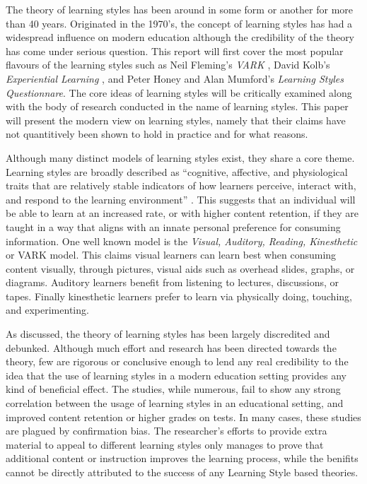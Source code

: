 \documentclass[12pt]{report}
\begin{document}
The theory of learning styles has been around in some form or another for more
than 40 years. Originated in the 1970's, the concept of learning styles has had
a widespread influence on modern education although the credibility of the
theory has come under serious question. This report will first cover the most
popular flavours of the learning styles such as Neil Fleming's \textit{VARK}
\cite{fleming2001teaching}, David Kolb's \textit{Experiential Learning}
\cite{kolb1984experiential}, and Peter Honey and Alan Mumford's \textit{Learning
Styles Questionnare}. The core ideas of learning styles will be critically
examined along with the body of research conducted in the name of learning
styles. This paper will present the modern view on learning styles, namely that
their claims have not quantitively been shown to hold in practice and for what
reasons.

Although many distinct models of learning styles exist, they share a core theme.
Learning styles are broadly described as ``cognitive, affective, and
physiological traits that are relatively stable indicators of how learners
perceive, interact with, and respond to the learning environment''
\cite{keefe1990developing}. This suggests that an individual will be able to
learn at an increased rate, or with higher content retention, if they are taught
in a way that aligns with an innate personal preference for consuming
information.  One well known model is the \textit{Visual, Auditory, Reading,
Kinesthetic} or VARK model. This claims visual learners can learn best when
consuming content visually, through pictures, visual aids such as overhead
slides, graphs, or diagrams. Auditory learners benefit from listening to
lectures, discussions, or tapes. Finally kinesthetic learners prefer to learn
via physically doing, touching, and experimenting.


As discussed, the theory of learning styles has been largely discredited and
debunked. Although much effort and research has been directed towards the
theory, few are rigorous or conclusive enough to lend any real credibility to
the idea that the use of learning styles in a modern education setting provides
any kind of beneficial effect. The studies, while numerous, fail to show any
strong correlation between the usage of learning styles in an educational
setting, and improved content retention or higher grades on tests. In many
cases, these studies are plagued by confirmation bias. The researcher's efforts
to provide extra material to appeal to different learning styles only manages to
prove that additional content or instruction improves the learning process,
while the benifits cannot be directly attributed to the success of any Learning
Style based theories.
\end{document}
